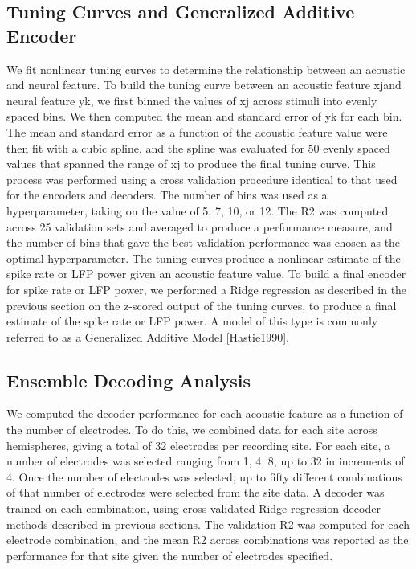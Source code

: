 \subsection{Tuning Curves and Generalized Additive Encoder}

    We fit nonlinear tuning curves to determine the relationship between an acoustic and neural feature. To build the tuning curve between an acoustic feature xjand neural feature yk, we first binned the values of xj across stimuli into evenly spaced bins. We then computed the mean and standard error of yk for each bin. The mean and standard error as a function of the acoustic feature value were then fit with a cubic spline, and the spline was evaluated for 50 evenly spaced values that spanned the range of xj to produce the final tuning curve. This process was performed using a cross validation procedure identical to that used for the encoders and decoders. The number of bins was used as a hyperparameter, taking on the value of 5, 7, 10, or 12. The R2 was computed across 25 validation sets and averaged to produce a performance measure, and the number of bins that gave the best validation performance was chosen as the optimal hyperparameter.
The tuning curves produce a nonlinear estimate of the spike rate or LFP power given an acoustic feature value. To build a final encoder for spike rate or LFP power, we performed a Ridge regression as described in the previous section on the z-scored output of the tuning curves, to produce a final estimate of the spike rate or LFP power. A model of this type is commonly referred to as a Generalized Additive Model [Hastie1990].

\subsection{Ensemble Decoding Analysis}

We computed the decoder performance for each acoustic feature as a function of the number of electrodes. To do this, we combined data for each site across hemispheres, giving a total of 32 electrodes per recording site. For each site, a number of electrodes was selected ranging from 1, 4, 8, up to 32 in increments of 4. Once the number of electrodes was selected, up to fifty different combinations of that number of electrodes were selected from the site data. A decoder was trained on each combination, using cross validated Ridge regression decoder methods described in previous sections. The validation R2 was computed for each electrode combination, and the mean R2 across combinations was reported as the performance for that site given the number of electrodes specified.

